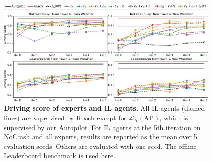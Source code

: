 %
%
%

\begin{figure}[t]
	\centering
	\includegraphics[width=0.99\textwidth]{img/score_eu_lb_tt_tn.pdf}
	\vspace{-1ex}
	\caption{\textbf{Driving score of experts and IL agents.} 
		All IL agents (dashed lines) are supervised by Roach except for $\mathcal{L}_\text{A}(\text{AP})$, which is supervised by our Autopilot. 
		For IL agents at the 5th iteration on NoCrash and all experts, results are reported as the mean over 5 evaluation seeds. 
		Others are evaluated with one seed. 
		The offline Leaderboard benchmark is used here.}
	\vspace{-1.5ex}
	\label{fig:score_eu_lb_tt_tn}
\end{figure}


